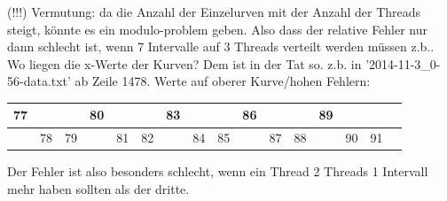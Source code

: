 \documentclass[12pt,a4paper]{article}
\begin{document}

(!!!) Vermutung: da die Anzahl der Einzelurven mit der Anzahl der Threads steigt, könnte es ein modulo-problem geben. Also dass der relative Fehler nur dann schlecht ist, wenn 7 Intervalle auf 3 Threads verteilt werden müssen z.b.. Wo liegen die x-Werte der Kurven?
Dem ist in der Tat so. z.b. in '2014-11-3\_0-56-data.txt' ab Zeile 1478. Werte auf oberer Kurve/hohen Fehlern:\\
\begin{tabular}{|c|c|c|c|c|c|c|c|c|c|c|c|c|c|c|c|}
	\hline
	77 &    &    & 80 &    &    & 83 &    &    & 86 &    &    & 89 &    &    \\
	\hline
	   & 78 & 79 &    & 81 & 82 &    & 84 & 85 &    & 87 & 88 &    & 90 & 91 \\
	\hline
\end{tabular}
Der Fehler ist also besonders schlecht, wenn ein Thread 2 Threads 1 Intervall mehr haben sollten als der dritte.\\
\end{document}
